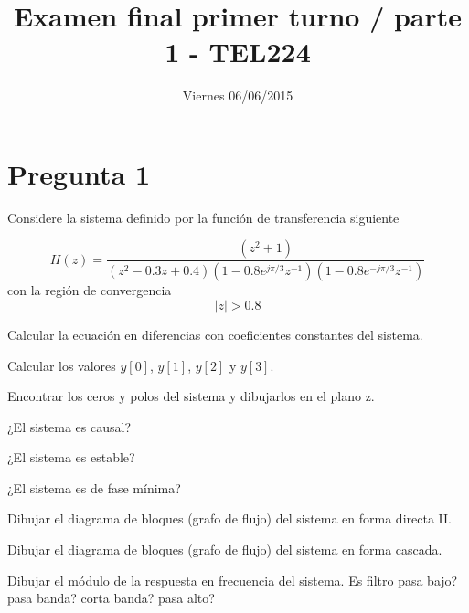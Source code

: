 \documentclass[addpoints]{exam}
\begin{document}
\headrule


\title{Examen final primer turno / parte 1 - TEL224}
\date{Viernes 06/06/2015}
\maketitle

\vspace{0.1in}

\section*{Pregunta 1}

Considere la sistema definido por la función de transferencia siguiente

$$H(z) = \frac{\left(z^{2} + 1\right)}{\left(z^{2}-0.3 z + 0.4\right)\left(1-0.8 e^{j\pi/3}z^{-1}\right)\left(1-0.8 e^{-j\pi/3}z^{-1}\right)}$$ con la región de convergencia $$|z| > 0.8$$

Calcular la ecuación en diferencias con coeficientes constantes del sistema.

Calcular los valores \(y[0]\), \(y[1]\), \(y[2]\) y \(y[3]\).

Encontrar los ceros y polos del sistema y dibujarlos en el plano z. 

¿El sistema es causal? 

¿El sistema es estable? 

¿El sistema es de fase mínima?

Dibujar el diagrama de bloques (grafo de flujo) del sistema en forma directa II.

Dibujar el diagrama de bloques (grafo de flujo) del sistema en forma cascada.

Dibujar el módulo de la respuesta en frecuencia del sistema. Es filtro pasa bajo? pasa banda? corta banda? pasa alto?

\footrule
{}
\end{document}
